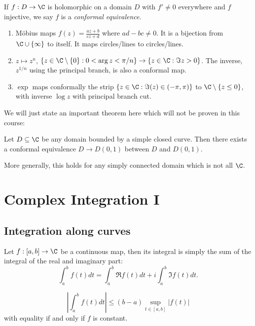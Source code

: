 \documentclass[a4paper]{article}
\begin{document}
\begin{definition}
  If \(f: D \to \C\) is holomorphic on a domain \(D\) with \(f' \neq 0\) everywhere and \(f\) injective, we say \(f\) is a \emph{conformal equivalence}.
\end{definition}

\begin{eg}\leavevmode
  \begin{enumerate}
  \item Möbius maps \(f(z) = \frac{az + b}{cz + d}\) where \(ad - bc \neq 0\). It is a bijection from \(\C \cup \{\infty\}\) to itself. It maps circles/lines to circles/lines.
  \item \(z \mapsto z^n\), \(\{z \in \C\setminus\{0\}: 0 < \arg z < \pi/n\} \to \{z \in \C: \Im z > 0\}\). The inverse, \(z^{1/n}\) using the principal branch, is also a conformal map.
  \item \(\exp\) maps conformally the strip \(\{z \in \C: \Im(z) \in (-\pi, \pi)\}\) to \(\C \setminus \{z \leq 0\}\), with inverse \(\log z\) with principal branch cut.
  \end{enumerate}
\end{eg}

We will just state an important theorem here which will not be proven in this course:

\begin{theorem}
  Let \(D \subseteq \C\) be any domain bounded by a simple closed curve. Then there exists a conformal equivalence \(D \to D(0, 1)\) between \(D\) and \(D(0, 1)\).

  More generally, this holds for any simply connected domain which is not all \(\C\).
\end{theorem}

\section{Complex Integration I}

\subsection{Integration along curves}

Let \(f: [a, b] \to \C\) be a continuous map, then its integral is simply the sum of the integral of the real and imaginary part:
\[
  \int_a^b f(t) dt = \int_a^b \Re f(t) dt + i \int_a^b \Im f(t) dt.
\]

\begin{proposition}
  \label{prop:absolute value integral inequality}
  \[
    \left| \int_a^b f(t) dt \right| \leq (b - a) \sup_{t \in [a, b]} |f(t)|
  \]
  with equality if and only if \(f\) is constant.
\end{proposition}
\end{document}
